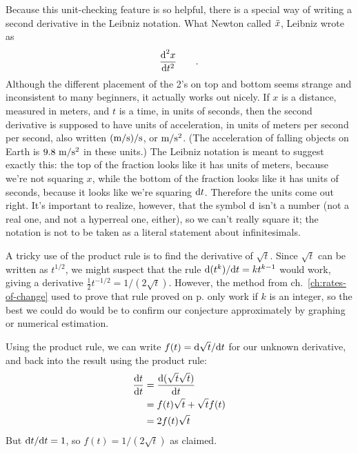 Because this unit-checking feature is so helpful, there is a special way of writing a second
derivative in the Leibniz notation. What Newton called $\Ddot{x}$, Leibniz wrote as
\begin{equation*}
  \frac{\textup{d}^2 x}{\textup{d} t^2} \qquad .
\end{equation*}
Although the different placement of the 2's on top and bottom seems strange and inconsistent to many
beginners, it actually works out nicely.
If $x$ is a distance, measured in meters, and $t$ is a time, in units of seconds, then the
second derivative is supposed to have units of acceleration, in units of meters per second per
second, also written $(\textup{m}/\textup{s})/\textup{s}$, or $\textup{m}/\textup{s}^2$. (The acceleration of falling
objects on Earth is $9.8\ \munit/\sunit^2$ in these units.) The Leibniz notation is meant to suggest
exactly this: the top of the fraction looks like it has units of meters, because we're not squaring $x$,
while the bottom of the fraction looks like it has units of seconds, because it looks like we're
squaring $\textup{d} t$. Therefore the units come out right. It's important to realize, however, that
the symbol $\textup{d}$ isn't a number (not a real one, and not a hyperreal one, either), so we can't really
square it; the notation is not to be taken as a literal statement about infinitesimals.

\begin{eg}\label{eg:derivative-of-sqrt}
A tricky use of the product rule is to find the derivative of $\sqrt{t}$. Since $\sqrt{t}$ can be
written as $t^{1/2}$, we might suspect that the rule $\textup{d}(t^k)/\textup{d} t=kt^{k-1}$ would work,
giving a derivative $\frac{1}{2}t^{-1/2}=1/(2\sqrt{t})$. However, the method from ch.~\ref{ch:rates-of-change} used to prove
that rule proved on p.\pageref{detour:polynomial-proof} only work if $k$ is an integer, so the best we could do would be to confirm
our conjecture approximately by graphing or numerical estimation.

Using the product rule, we can write $f(t)=\textup{d}\sqrt{t}/\textup{d} t$ for our unknown derivative, and
back into the result using the product rule:
\begin{align*}
  \frac{\textup{d} t}{\textup{d} t} &= \frac{\textup{d}(\sqrt{t}\sqrt{t})}{\textup{d} t} \\
           &= f(t)\sqrt{t}+\sqrt{t}f(t) \\
           &= 2f(t)\sqrt{t}
\end{align*}
But $\textup{d} t/\textup{d} t=1$, so $f(t)=1/(2\sqrt{t})$ as claimed.
\end{eg}

